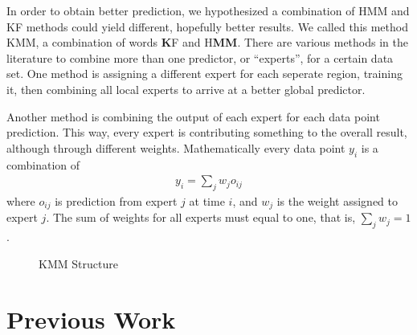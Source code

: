In order to obtain better prediction, we hypothesized a combination of HMM and
KF methods could yield different, hopefully better results. We called this
method KMM, a combination of words \textbf{K}F and H\textbf{MM}. There are
various methods in the literature to combine more than one predictor, or
``experts'', for a certain data set. One method is assigning a different expert
for each seperate region, training it, then combining all local experts to
arrive at a better global predictor.

Another method is combining the output of each expert for each data point
prediction. This way, every expert is contributing something to the overall
result, although through different weights. Mathematically every data point
$y_i$ is a combination of
\begin{eqnarray*}
y_i = \sum_j w_j o_{ij}
\end{eqnarray*}
where $o_{ij}$ is prediction from expert $j$ at time $i$, and $w_j$ is the
weight assigned to expert $j$. The sum of weights for all experts must equal to
one, that is, $\sum_j w_j = 1$. 

\begin{figure}[h]
\caption{KMM Structure}
\vspace{0.6cm}
\end{figure}


\section{Previous Work} \label{prevwork}

